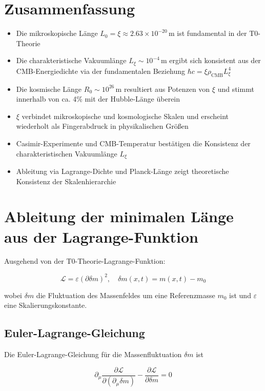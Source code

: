 \documentclass[12pt,a4paper]{article}
\numberwithin{equation}{section}
\begin{document}
	\section{Zusammenfassung}
	
	\begin{itemize}
		\item Die mikroskopische Länge $L_0 = \xi \approx 2.63 \times 10^{-20}\,\text{m}$ ist fundamental in der T0-Theorie
		\item Die charakteristische Vakuumlänge $L_\xi \sim 10^{-4}\,\text{m}$ ergibt sich konsistent aus der CMB-Energiedichte via der fundamentalen Beziehung $\hbar c = \xi \rho_{\text{CMB}} L_\xi^4$
		\item Die kosmische Länge $R_0 \sim 10^{26}\,\text{m}$ resultiert aus Potenzen von $\xi$ und stimmt innerhalb von ca. 4\% mit der Hubble-Länge überein
		\item $\xi$ verbindet mikroskopische und kosmologische Skalen und erscheint wiederholt als \glqq Fingerabdruck\grqq{} in physikalischen Größen
		\item Casimir-Experimente und CMB-Temperatur bestätigen die Konsistenz der charakteristischen Vakuumlänge $L_\xi$
		\item Ableitung via Lagrange-Dichte und Planck-Länge zeigt theoretische Konsistenz der Skalenhierarchie
	\end{itemize}
	
	\section{Ableitung der minimalen Länge aus der Lagrange-Funktion}
	
	Ausgehend von der T0-Theorie-Lagrange-Funktion:
	
	\begin{equation}
		\mathcal{L} = \varepsilon (\partial \delta m)^2, \quad \delta m(x,t) = m(x,t) - m_0
	\end{equation}
	
	wobei $\delta m$ die Fluktuation des Massenfeldes um eine Referenzmasse $m_0$ ist und $\varepsilon$ eine Skalierungskonstante.
	
	\subsection{Euler-Lagrange-Gleichung}
	
	Die Euler-Lagrange-Gleichung für die Massenfluktuation $\delta m$ ist
	
	\begin{equation}
		\partial_\mu \frac{\partial \mathcal{L}}{\partial (\partial_\mu \delta m)} - \frac{\partial \mathcal{L}}{\partial \delta m} = 0
	\end{equation}
	
\end{document}
